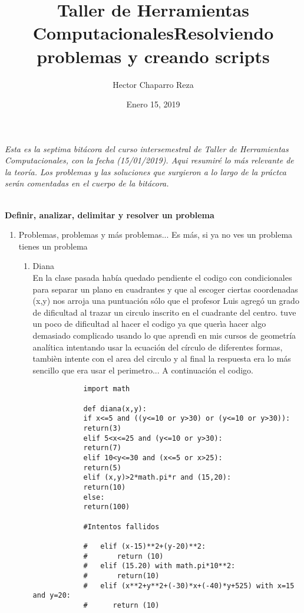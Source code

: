 \documentclass[letterpaper, 12pt, oneside]{article}
\title{\Huge{Taller de Herramientas Computacionales}}
\author{Hector Chaparro Reza}
\date{Enero 15, 2019}
\begin{document}
	\maketitle
	\it Esta es la septima bit\'acora del curso intersemestral de Taller de Herramientas Computacionales, con la fecha (15/01/2019). Aqui resumir\'e lo m\'as relevante de la teor\'ia. Los problemas y las soluciones que surgieron a lo largo de la pr\'actca ser\'an comentadas en el cuerpo de la bit\'acora.\\
	\newpage
	
	
	\title{\Huge{Resolviendo problemas y creando scripts}}\\
	
	\textbf{Definir, analizar, delimitar y resolver un problema}\\
	
	\begin{enumerate}
		\item {Problemas, problemas y más problemas... Es más, si ya no ves un problema tienes un problema}
		\begin{enumerate}
			\item Diana\\
			En la clase pasada había quedado pendiente el codigo con condicionales para separar un plano en cuadrantes y que al escoger ciertas coordenadas (x,y) nos arroja una puntuación sólo que el profesor Luis agregó un grado de dificultad al trazar un circulo inscrito en el cuadrante del centro. tuve un poco de dificultad al hacer el codigo ya que querìa hacer algo demasiado complicado usando lo que aprendì en mis cursos de geometría analítica intentando usar la ecuación del círculo de diferentes formas, tambièn intente con el area del circulo y al final la respuesta era lo más sencillo que era usar el perimetro... A continuación el codigo. \\
			
			\newpage
			\begin{verbatim}
			import math
			
			def diana(x,y):
			if x<=5 and ((y<=10 or y>30) or (y<=10 or y>30)):
			return(3)
			elif 5<x<=25 and (y<=10 or y>30):
			return(7)
			elif 10<y<=30 and (x<=5 or x>25):
			return(5)
			elif (x,y)>2*math.pi*r and (15,20):
			return(10)
			else:
			return(100)
			
			#Intentos fallidos
			
			#   elif (x-15)**2+(y-20)**2:
			#       return (10)
			#   elif (15.20) with math.pi*10**2:
			#       return(10)
			#   elif (x**2+y**2+(-30)*x+(-40)*y+525) with x=15 and y=20:
			#      return (10) 
			\end{verbatim}
			

\end{enumerate}
\end{enumerate}
\end{document}
